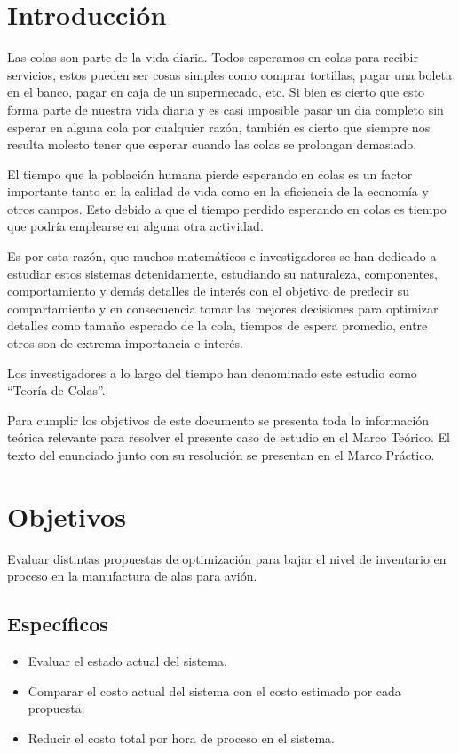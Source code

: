 \documentclass{article}
\begin{document}

\tableofcontents
\listoffigures
\clearpage
\section{Introducción}
Las colas son parte de la vida diaria. Todos esperamos en colas
para recibir servicios, estos pueden ser cosas simples como 
comprar tortillas, pagar una boleta en el banco, pagar en caja
de un supermecado, etc. Si bien es cierto que esto forma parte de
nuestra vida diaria y es casi imposible pasar un dia completo sin 
esperar en alguna cola por cualquier razón, también es cierto
que siempre nos resulta molesto tener que esperar cuando las colas 
se prolongan demasiado.

El tiempo que la población humana pierde esperando en colas es un 
factor importante tanto en la calidad de vida como en la eficiencia
de la economía y otros campos. Esto debido a que el tiempo
perdido esperando en colas es tiempo que podría emplearse 
en alguna otra actividad.

Es por esta razón, que muchos matemáticos e investigadores se han
dedicado a estudiar estos sistemas detenidamente, estudiando
su naturaleza, componentes, comportamiento y demás detalles 
de interés con el objetivo de predecir su compartamiento y en
consecuencia tomar las mejores decisiones para optimizar detalles
como tamaño esperado de la cola, tiempos de espera promedio, entre 
otros son de extrema importancia e interés. 

Los investigadores a lo largo del tiempo han denominado este estudio
como ``Teoría de Colas''.

Para cumplir los objetivos de este documento se presenta toda la información
teórica relevante para resolver el presente caso de estudio en el Marco Teórico.
El texto del enunciado junto con su resolución se presentan en el Marco Práctico.

\clearpage
\section{Objetivos}
Evaluar distintas propuestas de optimización para bajar el nivel de inventario 
en proceso en la manufactura de alas para avión.
\subsection{Específicos}
\begin{itemize}
	\item Evaluar el estado actual del sistema.
	\item Comparar el costo actual del sistema con el costo estimado por 
		cada propuesta.
	\item Reducir el costo total por hora de proceso en el sistema.
\end{itemize}
\clearpage
\end{document}
